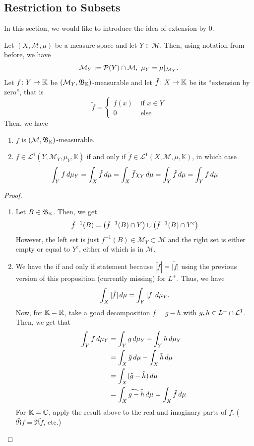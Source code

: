 \documentclass[11pt,leqno,oneside]{amsbook}
\numberwithin{thm}{section}
\renewcommand{\P}{\mathcal{P}}
\newcommand{\M}{\mathcal{M}}
\newcommand{\cL}{\mathcal{L}}
\newcommand{\K}{\mathbb{K}} %
\begin{document}
\subsection{Restriction to Subsets}
In this section, we would like to introduce the idea of extension by
0.
\begin{prop}
  Let \((X,\M,\mu)\) be a measure space and let \(Y \in \M\). Then,
  using notation from before, we have \[
    \M_Y := \P(Y) \intersect \M, \ \mu_Y = \mu|_{\M_Y}.
  \]
  Let \(f \from Y \to \K\) be \((\M_Y,\B_\K)\)-measurable and let
  \(\tilde{f} \from X \to \K\) be its ``extension by zero'', that
  is \[
    \tilde{f} =
    \begin{cases}
      f(x) & \text{ if }x \in Y \\
      0 & \text{ else }
    \end{cases}
  \]
  Then, we have
  \begin{enumerate}
  \item \(\tilde{f}\) is \((\M,\B_\K)\)-measurable.
  \item \(f \in \cL^1(Y,\M_Y,\mu_Y,\K)\) if and only if \(\tilde{f}
    \in \cL^1(X,\M,\mu,\K)\), in which case \[
      \int_Y f \, d\mu_Y = \int_X \tilde{f} \, d\mu = \int_X \tilde{f}
      \chi_Y \, d\mu = \int_Y \tilde{f} \, d\mu = \int_Y f \, d\mu
    \]
  \end{enumerate}
\end{prop}
\begin{proof}
  \begin{enumerate}
  \item Let \(B \in \B_\K\). Then, we get \[
      \tilde{f}^{-1}(B) = \left( \tilde{f}^{-1}(B) \cap Y
      \right) \cup \left( \tilde{f}^{-1}(B) \cap Y^c \right)
    \]
    However, the left set is just \(f^{-1}(B) \in \M_Y \subset \M\)
    and the right set is either empty or equal to \(Y^c\), either of
    which is in \(\M\).
  \item We have the if and only if statement because \(|\tilde{f}| =
    \widetilde{|f|}\) using the previous version of this proposition
    (currently missing) for \(L^+\). Thus, we have \[
      \int_X |\tilde{f}| \, d\mu = \int_Y |f| \, d\mu_Y.
    \]
    Now, for \(\K=\R\), take a good decomposition \(f = g-h\) with
    \(g,h \in L^+ \intersect \cL^1\). Then, we get that
    \begin{align*}
      \int_Y f \, d\mu_Y & = \int_Y g \, d\mu_Y - \int_Y h \, d\mu_Y \\
                      & = \int_X \tilde{g} \, d\mu - \int_X \tilde{h} \, d\mu \\
                      & = \int_X (\tilde{g} - \tilde{h}) \, d\mu \\
      & = \int_X \widetilde{g-h} \, d\mu = \int_X \tilde{f} \, d\mu.
    \end{align*}
    For \(\K = \C\), apply the result above to the real and imaginary
    parts of \(f\). (\(\widetilde{\Re f} = \Re \tilde{f}\), etc.)
  \end{enumerate}
\end{proof}
\end{document}
